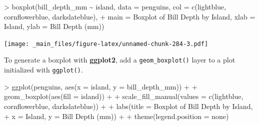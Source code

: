 \documentclass[
]{book}
\newenvironment{Shaded}{\begin{snugshade}}{\end{snugshade}}
\newcommand{\AttributeTok}[1]{\textcolor[rgb]{0.77,0.63,0.00}{#1}}
\newcommand{\FunctionTok}[1]{\textcolor[rgb]{0.00,0.00,0.00}{#1}}
\newcommand{\NormalTok}[1]{#1}
\newcommand{\SpecialCharTok}[1]{\textcolor[rgb]{0.00,0.00,0.00}{#1}}
\newcommand{\StringTok}[1]{\textcolor[rgb]{0.31,0.60,0.02}{#1}}
\begin{document}
\begin{Shaded}
\begin{Highlighting}[]
\SpecialCharTok{\textgreater{}} \FunctionTok{boxplot}\NormalTok{(bill\_depth\_mm }\SpecialCharTok{\textasciitilde{}}\NormalTok{ island, }\AttributeTok{data =}\NormalTok{ penguins, }\AttributeTok{col =} \FunctionTok{c}\NormalTok{(}\StringTok{\textquotesingle{}lightblue\textquotesingle{}}\NormalTok{, }\StringTok{\textquotesingle{}cornflowerblue\textquotesingle{}}\NormalTok{, }\StringTok{\textquotesingle{}darkslateblue\textquotesingle{}}\NormalTok{),}
\SpecialCharTok{+}         \AttributeTok{main =} \StringTok{\textquotesingle{}Boxplot of Bill Depth by Island\textquotesingle{}}\NormalTok{, }\AttributeTok{xlab =} \StringTok{\textquotesingle{}Island\textquotesingle{}}\NormalTok{, }\AttributeTok{ylab =} \StringTok{\textquotesingle{}Bill Depth (mm)\textquotesingle{}}\NormalTok{)}
\end{Highlighting}
\end{Shaded}

\texttt{[image: \_main\_files/figure-latex/unnamed-chunk-284-3.pdf]}

To generate a boxplot with \textbf{ggplot2}, add a \texttt{geom\_boxplot()} layer to a plot initialized with \texttt{ggplot()}.

\begin{Shaded}
\begin{Highlighting}[]
\SpecialCharTok{\textgreater{}} \FunctionTok{ggplot}\NormalTok{(penguins, }\FunctionTok{aes}\NormalTok{(}\AttributeTok{x =}\NormalTok{ island, }\AttributeTok{y =}\NormalTok{ bill\_depth\_mm)) }\SpecialCharTok{+}
\SpecialCharTok{+}   \FunctionTok{geom\_boxplot}\NormalTok{(}\FunctionTok{aes}\NormalTok{(}\AttributeTok{fill =}\NormalTok{ island)) }\SpecialCharTok{+}
\SpecialCharTok{+}   \FunctionTok{scale\_fill\_manual}\NormalTok{(}\AttributeTok{values =} \FunctionTok{c}\NormalTok{(}\StringTok{\textquotesingle{}lightblue\textquotesingle{}}\NormalTok{, }\StringTok{\textquotesingle{}cornflowerblue\textquotesingle{}}\NormalTok{, }\StringTok{\textquotesingle{}darkslateblue\textquotesingle{}}\NormalTok{)) }\SpecialCharTok{+}
\SpecialCharTok{+}   \FunctionTok{labs}\NormalTok{(}\AttributeTok{title =} \StringTok{\textquotesingle{}Boxplot of Bill Depth by Island\textquotesingle{}}\NormalTok{, }
\SpecialCharTok{+}        \AttributeTok{x =} \StringTok{\textquotesingle{}Island\textquotesingle{}}\NormalTok{, }\AttributeTok{y =} \StringTok{\textquotesingle{}Bill Depth (mm)\textquotesingle{}}\NormalTok{) }\SpecialCharTok{+}
\SpecialCharTok{+}   \FunctionTok{theme}\NormalTok{(}\AttributeTok{legend.position =} \StringTok{\textquotesingle{}none\textquotesingle{}}\NormalTok{)}
\end{Highlighting}
\end{Shaded}
\end{document}
